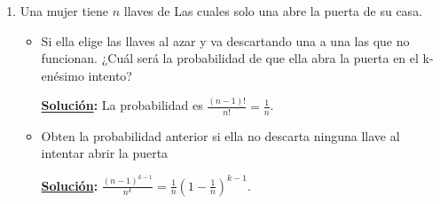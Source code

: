 \documentclass[11pt,letterpaper]{report}
\newcommand{\sol}{\textbf{\underline{Solución}: }} %
\begin{document}
\begin{enumerate}
(Solución con orden)

\begin{itemize}
    \item haya exactamente una persona entre $A$ y $B$?
    
    \sol Si fijamos a $A$, hay 3 posiciones puede ser acomodada y el lugar de $B$ es el $i+2$. Y las
    otras personas $C,D,E$ pueden ser acomodadas en $3!$ maneras distintas. Análogamente cuando
    primero sea $B$ y luego $A$ (razón por la cual se multiplica por 2). Como hay $5!$ posibles
    acomodos. Ergo la probabilidad de que haya exactamente una persona entre $A$ y $B$
    es $\frac{2 \cdot 3 \cdot 3!}{5!} = \frac{3}{10}$.

    \item hayan exactamente dos personas entre $A$ y $B$?
    
    \sol Análogo al inciso anterior, hay 2 posiciónes para seleccionar a $A$ (sin perdida de
    generalidad) y $C,D,E$ pueden ser acomodadas en $3!$ maneras distintas. Por tanto hay 
    $2 \cdot 2 \cdot 3!$ acomodos posibles de la maneras que se nos pide. Como hay $5!$ posibles
    acomodos, ergo la probabilidad de que hayan exactamente dos personas entre $A$ y $B$ es
    $\frac{2 \cdot 2 \cdot 3!}{5!}=\frac{1}{5}$.

    \item hayan exactamente tres personas entre $A$ y $B$?
    
    \sol Con la misma idea de los incisos anteriores, entonces se tiene que es
    $\frac{2 \cdot 1 \cdot 3!}{5!}=\frac{1}{10}$.
\end{itemize}

\item Una mujer tiene $n$ llaves de Las cuales solo una abre la puerta de su casa.
\begin{itemize}
    \item Si ella elige las llaves al azar y va descartando una a una las que no funcionan. ¿Cuál 
    será la probabilidad de que ella abra la puerta en el k-enésimo intento?

    \sol La probabilidad es $\frac{(n-1)!}{n!}= \frac{1}{n}$.

    \item Obten la probabilidad anterior si ella no descarta ninguna llave al intentar
    abrir la puerta
    
    \sol $\frac{(n-1)^{k-1}}{n^k} = \frac{1}{n} (1- \frac{1}{n})^{k-1}$.
\end{itemize}


\end{enumerate}
\end{document}
